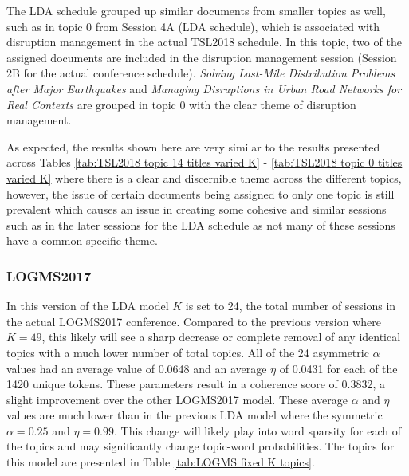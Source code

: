 \documentclass[a4paper, 12pt, twoside]{article}
\numberwithin{equation}{section} %
\begin{document}
The LDA schedule grouped up similar documents from smaller topics as well, such as in topic 0 from Session 4A (LDA schedule), which is associated with disruption management in the actual TSL2018 schedule. In this topic, two of the assigned documents are included in the disruption management session (Session 2B for the actual conference schedule). \textit{Solving Last-Mile Distribution Problems after Major Earthquakes} and \textit{Managing Disruptions in Urban Road Networks for Real Contexts} are grouped in topic 0 with the clear theme of disruption management.

As expected, the results shown here are very similar to the results presented across Tables \ref{tab:TSL2018 topic 14 titles varied K} - \ref{tab:TSL2018 topic 0 titles varied K} where there is a clear and discernible theme across the different topics, however, the issue of certain documents being assigned to only one topic is still prevalent which causes an issue in creating some cohesive and similar sessions such as in the later sessions for the LDA schedule as not many of these sessions have a common specific theme. 


\subsubsection{LOGMS2017}

In this version of the LDA model $K$ is set to 24, the total number of sessions in the actual LOGMS2017 conference. Compared to the previous version where $K =49$, this likely will see a sharp decrease or complete removal of any identical topics with a much lower number of total topics. All of the 24 asymmetric $\alpha$ values had an average value of 0.0648 and an average $\eta$ of 0.0431 for each of the 1420 unique tokens. These parameters result in a coherence score of 0.3832, a slight improvement over the other LOGMS2017 model. These average $\alpha$ and $\eta$ values are much lower than in the previous LDA model where the symmetric $\alpha = 0.25$ and $\eta = 0.99$. This change will likely play into word sparsity for each of the topics and may significantly change topic-word probabilities. The topics for this model are presented in Table \ref{tab:LOGMS fixed K topics}. 
\end{document}
